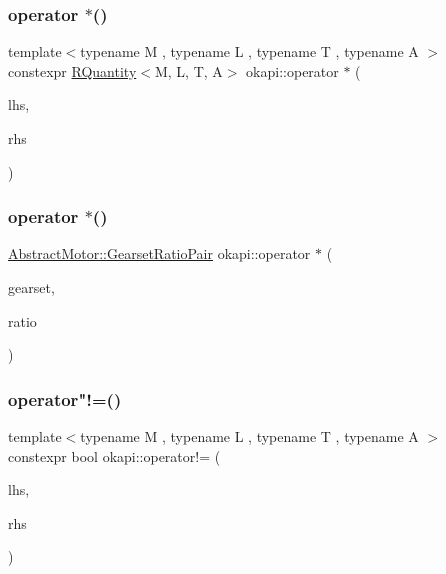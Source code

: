 \mbox{\label{namespaceokapi_a763b1c8386a8cb4e0cb5f1174e8d91ae}} 
\subsubsection{\texorpdfstring{operator $\ast$()}{operator *()}\hspace{0.1cm}{\footnotesize\ttfamily [3/4]}}
{\footnotesize\ttfamily template$<$typename M , typename L , typename T , typename A $>$ \\
constexpr \mbox{\hyperlink{classokapi_1_1RQuantity}{R\+Quantity}}$<$M, L, T, A$>$ okapi\+::operator $\ast$ (\begin{DoxyParamCaption}\item[{const \mbox{\hyperlink{classokapi_1_1RQuantity}{R\+Quantity}}$<$ M, L, T, A $>$ \&}]{lhs,  }\item[{const double \&}]{rhs }\end{DoxyParamCaption})}

\mbox{\label{namespaceokapi_ade4f34671410d2b847d7b0366ab60ba1}} 
\subsubsection{\texorpdfstring{operator $\ast$()}{operator *()}\hspace{0.1cm}{\footnotesize\ttfamily [4/4]}}
{\footnotesize\ttfamily \mbox{\hyperlink{structokapi_1_1AbstractMotor_1_1GearsetRatioPair}{Abstract\+Motor\+::\+Gearset\+Ratio\+Pair}} okapi\+::operator $\ast$ (\begin{DoxyParamCaption}\item[{\mbox{\hyperlink{classokapi_1_1AbstractMotor_a88aaa6ea2fa10f5520a537bbf26774d5}{Abstract\+Motor\+::gearset}}}]{gearset,  }\item[{double}]{ratio }\end{DoxyParamCaption})}

\mbox{\label{namespaceokapi_a118add088592d8d0de817c35cff350b2}} 
\subsubsection{\texorpdfstring{operator"!=()}{operator!=()}}
{\footnotesize\ttfamily template$<$typename M , typename L , typename T , typename A $>$ \\
constexpr bool okapi\+::operator!= (\begin{DoxyParamCaption}\item[{const \mbox{\hyperlink{classokapi_1_1RQuantity}{R\+Quantity}}$<$ M, L, T, A $>$ \&}]{lhs,  }\item[{const \mbox{\hyperlink{classokapi_1_1RQuantity}{R\+Quantity}}$<$ M, L, T, A $>$ \&}]{rhs }\end{DoxyParamCaption})}

